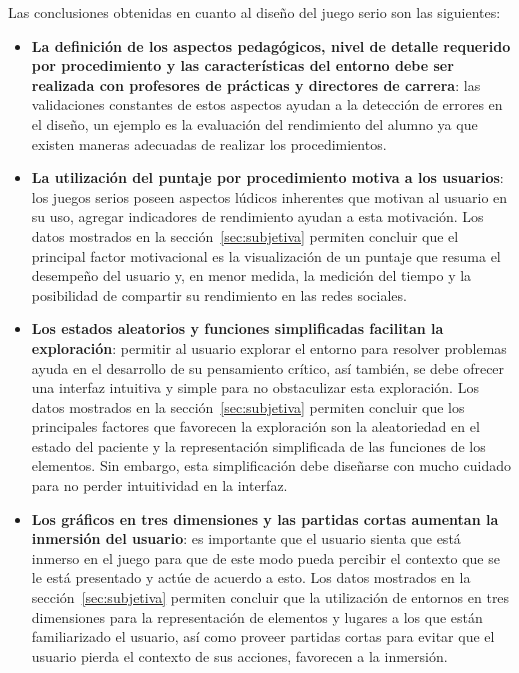 Las conclusiones obtenidas en cuanto al diseño del juego serio son las siguientes:

\begin{itemize}


\item \textbf{La definición de los aspectos pedagógicos, nivel de detalle
        requerido por procedimiento y las características del entorno debe ser
        realizada con profesores de prácticas y directores de carrera}: las
    validaciones constantes de estos aspectos ayudan a la detección de errores
    en el diseño, un ejemplo es la evaluación del rendimiento del alumno ya que
    existen maneras adecuadas de realizar los procedimientos.

\item \textbf{La utilización del puntaje por procedimiento motiva a los
        usuarios}: los juegos serios poseen aspectos lúdicos inherentes que
    motivan al usuario en su uso, agregar indicadores de rendimiento ayudan a
    esta motivación. Los datos mostrados en la sección~\ref{sec:subjetiva}
    permiten concluir que el principal factor motivacional es la visualización
    de un puntaje que resuma el desempeño del usuario y, en menor medida, la
    medición del tiempo y la posibilidad de compartir su rendimiento en las
    redes sociales. 

\item \textbf{Los estados aleatorios y funciones simplificadas facilitan la
        exploración}: permitir al usuario explorar el entorno para resolver
    problemas ayuda en el desarrollo de su pensamiento crítico, así también, se
    debe ofrecer una interfaz intuitiva y simple para no obstaculizar esta
    exploración. Los datos mostrados en la sección~\ref{sec:subjetiva} permiten
    concluir que los principales factores que favorecen la exploración son la
    aleatoriedad en el estado del paciente y la representación simplificada de
    las funciones de los elementos. Sin embargo, esta simplificación debe
    diseñarse con mucho cuidado para no perder intuitividad en la interfaz. 

\item \textbf{Los gráficos en tres dimensiones y las partidas cortas aumentan la
        inmersión del usuario}: es importante que el usuario sienta que está
    inmerso en el juego para que de este modo pueda percibir el contexto que se
    le está presentado y actúe de acuerdo a esto. Los datos mostrados en la
    sección~\ref{sec:subjetiva} permiten concluir que la utilización de entornos
    en tres dimensiones para la representación de elementos y lugares a los que
    están familiarizado el usuario, así como proveer partidas cortas para
    evitar que el usuario pierda el contexto de sus acciones, favorecen a la
    inmersión. 


\end{itemize}
